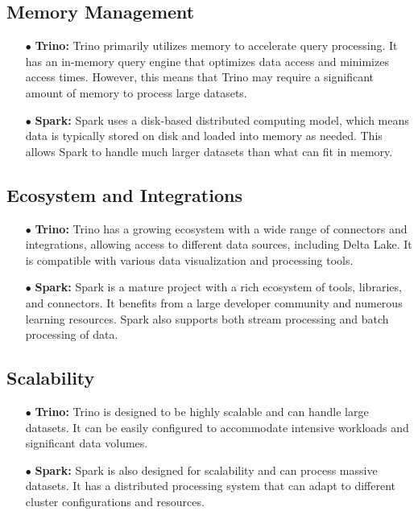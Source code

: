 \subsection{Memory Management}
\begin{enumerate}
\item[$\bullet$] \textbf{Trino:} Trino primarily utilizes memory to accelerate query processing. It has an in-memory query engine that optimizes data access and minimizes access times. However, this means that Trino may require a significant amount of memory to process large datasets.
\item[$\bullet$] \textbf{Spark:} Spark uses a disk-based distributed computing model, which means data is typically stored on disk and loaded into memory as needed. This allows Spark to handle much larger datasets than what can fit in memory.
\end{enumerate}

\subsection{Ecosystem and Integrations}
\begin{enumerate}
\item[$\bullet$] \textbf{Trino:} Trino has a growing ecosystem with a wide range of connectors and integrations, allowing access to different data sources, including Delta Lake. It is compatible with various data visualization and processing tools.
\item[$\bullet$] \textbf{Spark:} Spark is a mature project with a rich ecosystem of tools, libraries, and connectors. It benefits from a large developer community and numerous learning resources. Spark also supports both stream processing and batch processing of data.
\end{enumerate}

\subsection{Scalability}
\begin{enumerate}
\item[$\bullet$] \textbf{Trino:} Trino is designed to be highly scalable and can handle large datasets. It can be easily configured to accommodate intensive workloads and significant data volumes.
\item[$\bullet$] \textbf{Spark:} Spark is also designed for scalability and can process massive datasets. It has a distributed processing system that can adapt to different cluster configurations and resources.
\end{enumerate}

